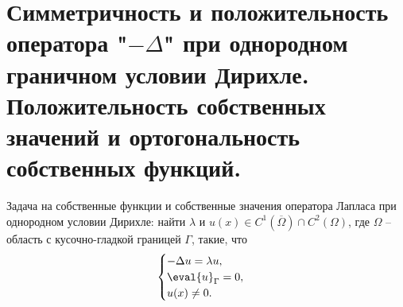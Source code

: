 \section{Симметричность и положительность оператора "$-\Delta$" при однородном граничном условии Дирихле. Положительность собственных значений и ортогональность собственных функций.}
Задача на собственные функции и собственные значения оператора Лапласа при однородном условии Дирихле:
найти $\lambda$ и $u(x) \in C^1(\overline{\Omega}) \cap C^2(\Omega)$, где $\Omega$ -- область с кусочно-гладкой границей $\Gamma$, такие, что
\[
\begin{cases}
- \Delta u= \lambda u,\\
\eval{u}_\Gamma=0,\\
u(x) \neq 0.
\end{cases} 
\]

